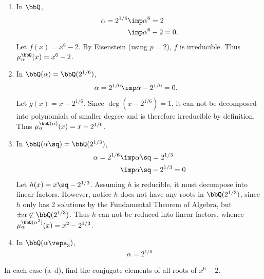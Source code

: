 \documentclass{article}
\begin{document}
\begin{solution}
\begin{enumerate}[label=\alph*)]
  \item In $ \bbQ $, \begin{align*}
    \alpha = 2^{1/6} &\imp \alpha^6 = 2 \\
    &\imp \alpha^6 - 2 = 0.
  \end{align*}
  Let $ f(x) = x^6-2 $. By Eisenstein (using $ p=2 $), $ f $ is irreducible. Thus $ \mu_\alpha^\bbQ (x) = x^6 - 2 $.

  \item In $ \bbQ(\alpha)=\bbQ(2^{1/6}) $, \begin{align*}
    \alpha = 2^{1/6} &\imp \alpha - 2^{1/6} = 0.
  \end{align*}
  Let $ g(x) = x-2^{1/6} $. Since $ \deg(x-2^{1/6}) = 1 $, it can not be decomposed into  polynomials of smaller degree and is therefore irreducible by definition. Thus $ \mu_\alpha^{\bbQ(\alpha)} (x) = x - 2^{1/6} $.

  \item In $ \bbQ(\alpha\sq)=\bbQ(2^{1/3}) $, \begin{align*}
    \alpha = 2^{1/6} &\imp \alpha\sq = 2^{1/3} \\
    &\imp \alpha\sq - 2^{1/3} = 0
  \end{align*}
  Let $ h(x) = x\sq-2^{1/3} $. Assuming $ h $ is reducible, it must decompose into linear factors. However, notice $ h $ does not have any roots in $ \bbQ(2^{1/3}) $, since $ h $ only has 2 solutions by the Fundamental Theorem of Algebra, but $ \pm\alpha\not\in \bbQ(2^{1/3}) $. Thus $ h $ can not be reduced into linear factors, whence $ \mu_\alpha^{\bbQ(\alpha^2)}(x) = x^2-2^{1/3} $.

  \item In $ \bbQ(\alpha\veps_3) $, \begin{align*}
    \alpha = 2^{1/6}
  \end{align*}
\end{enumerate}
\end{solution}

\begin{subexercise}
In each case (a--d), find the conjugate elements of all roots of $ x^6-2 $.
\end{subexercise}
\end{document}
